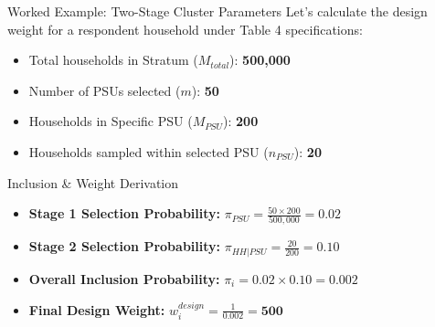 \documentclass[10pt, aspectratio=169]{beamer}
\begin{document}
\begin{frame}{Worked Example: Two-Stage Cluster Parameters}
  Let's calculate the design weight for a respondent household under Table 4 specifications:
  \begin{itemize}
    \item Total households in Stratum ($M_{total}$): \textbf{500,000}
    \item Number of PSUs selected ($m$): \textbf{50}
    \item Households in Specific PSU ($M_{PSU}$): \textbf{200}
    \item Households sampled within selected PSU ($n_{PSU}$): \textbf{20}
  \end{itemize}

  \begin{block}{Inclusion \& Weight Derivation}
    \begin{itemize}
      \item \textbf{Stage 1 Selection Probability:} $\pi_{PSU} = \frac{50 \times 200}{500,000} = 0.02$
      \item \textbf{Stage 2 Selection Probability:} $\pi_{HH|PSU} = \frac{20}{200} = 0.10$
      \item \textbf{Overall Inclusion Probability:} $\pi_i = 0.02 \times 0.10 = 0.002$
      \item \textbf{Final Design Weight:} $w_{i}^{design} = \frac{1}{0.002} = \mathbf{500}$
    \end{itemize}
  \end{block}
\end{frame}
\end{document}
